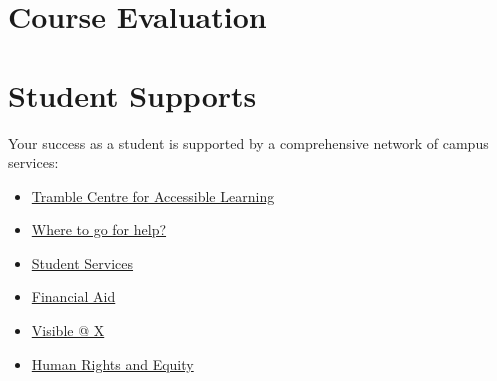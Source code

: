 \documentclass[12pt]{article}
\begin{document}
\section*{Course Evaluation}

\begin{stfxevaluation}





\end{stfxevaluation}

\section*{Student Supports}

Your success as a student is supported by a comprehensive network of campus services:

\begin{itemize}
  \item \href{https://www.stfx.ca/student-services/academic-services/accessible-learning}{Tramble Centre for Accessible Learning}
  \item \href{https://www.stfx.ca/programs-courses/stfx-online/student-support}{Where to go for help?}
  \item \href{https://www.stfx.ca/student-life-support/student-services-department}{Student Services}
  \item \href{https://www.stfx.ca/applications-admissions/financial-support/financial-aid-office}{Financial Aid}
  \item \href{https://www.stfx.ca/student-services/support-services/visible-at-x}{Visible @ X}
  \item \href{https://www.stfx.ca/student-services/support-services/human-rights-equity}{Human Rights and Equity}
\end{itemize}
\end{document}
